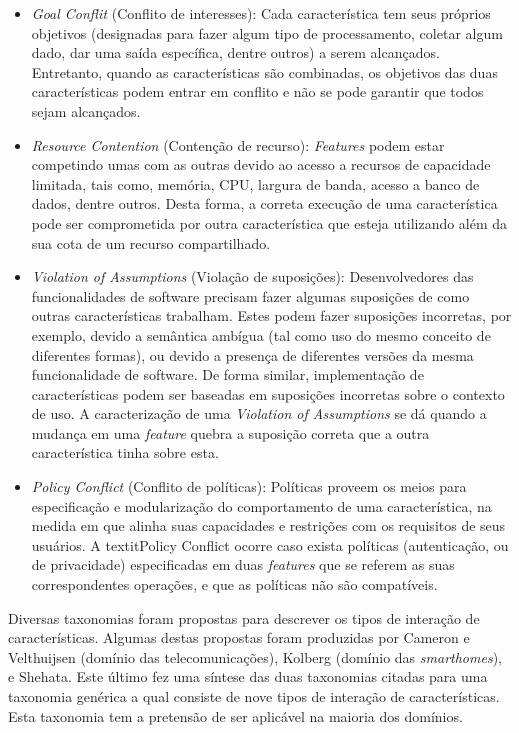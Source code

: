 \begin{itemize}
\item \textit{Goal Conflit} (Conflito de interesses): Cada característica tem seus próprios objetivos (designadas para fazer algum tipo de processamento, coletar algum dado, dar uma saída específica, dentre outros) a serem alcançados. Entretanto, quando as características são combinadas, os objetivos das duas características podem entrar em conflito e não se pode garantir que todos sejam alcançados. 
\item \textit{Resource Contention} (Contenção de recurso): \textit{Features} podem estar competindo umas com as outras devido ao acesso a recursos de capacidade limitada, tais como, memória, CPU, largura de banda, acesso a banco de dados, dentre outros. Desta forma, a correta execução de uma característica pode ser comprometida por outra característica que esteja utilizando além da sua cota de um recurso compartilhado.
\item \textit{Violation of Assumptions} (Violação de suposições): Desenvolvedores das funcionalidades de software precisam fazer algumas suposições de como outras características trabalham. Estes podem fazer suposições incorretas, por exemplo, devido a semântica ambígua (tal como uso do mesmo conceito de diferentes formas), ou devido a presença de diferentes versões da mesma funcionalidade de software. De forma similar, implementação de características podem ser baseadas em suposições incorretas sobre o contexto de uso. A caracterização de uma  \textit{Violation of Assumptions} se dá quando a mudança em uma \textit{feature} quebra a suposição correta que a outra característica tinha sobre esta.
\item \textit{Policy Conflict} (Conflito de políticas): Políticas proveem os meios para especificação e modularização do comportamento de uma característica, na medida em que alinha suas capacidades e restrições com os requisitos de seus usuários. A textit{Policy Conflict} ocorre caso exista políticas (autenticação, ou de privacidade) especificadas em duas \textit{features} que se referem as suas correspondentes operações, e que as políticas não são compatíveis.
\end{itemize}

Diversas taxonomias foram propostas para descrever os tipos de interação de características. Algumas destas propostas foram produzidas por Cameron e Velthuijsen (domínio das telecomunicações), Kolberg (domínio das \textit{smarthomes}), e Shehata. Este último fez uma síntese das duas taxonomias citadas para uma taxonomia genérica a qual consiste de nove tipos de interação de características. Esta taxonomia tem a pretensão de ser aplicável na maioria dos domínios.\cite{NHLABATSI:2008}

